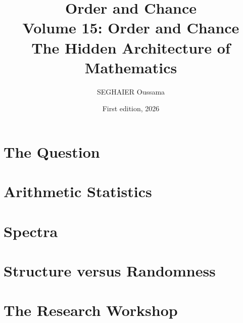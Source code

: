\documentclass[11pt,openany]{book}
\title{\Huge\textbf{Order and Chance}\\[0.4em]\LARGE Volume 15: Order and Chance\\[0.6em]
\Large The Hidden Architecture of Mathematics}
\author{SEGHAIER Oussama}
\date{First edition, 2026}
\begin{document}
\frontmatter
\makecover
\maketitle

\tableofcontents

\mainmatter

\part{The Question}




\part{Arithmetic Statistics}






\part{Spectra}




\part{Structure versus Randomness}



\part{The Research Workshop}



\end{document}
